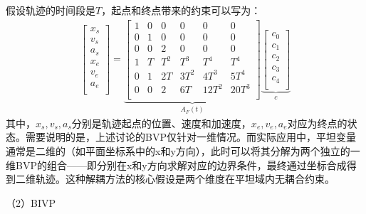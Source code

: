 \documentclass[master,academic]{ysuthesis} %
\begin{document}
		假设轨迹的时间段是$T$，起点和终点带来的约束可以写为：
		\begin{equation}
			\begin{aligned}
				\left[ \begin{array}{c}
				x_s\\
				v_s\\
				a_s\\
				x_e\\
				v_e\\
				a_e\\
				\end{array} \right] 
				=\underbrace{\begin{bmatrix}
					1&		0&		0&		0&		0&		0\\
					0&		1&		0&		0&		0&		0\\
					0&		0&		2&		0&		0&		0\\
					1&		T&		T^2&		T^3&		T^4&		T^4\\
					0&		1&		2T&		3T^2&		4T^3&		5T^4\\
					0&		0&		2&		6T&		12T^2&		20T^3\\
					\end{bmatrix}}_{A_F(t)}  
				\underbrace{\begin{bmatrix}
				c_0\\
				c_1\\
				c_2\\
				c_3\\
				c_4\\
				\end{bmatrix}}_{c} 
			\end{aligned}
			\label{eq:BVP}
		\end{equation}
		其中，$x_s,v_s,a_s$分别是轨迹起点的位置、速度和加速度，$x_e,v_e,a_e$对应为终点的状态。需要说明的是，上述讨论的BVP仅针对一维情况。而实际应用中，平坦变量通常是二维的（如平面坐标系中的x和y方向），此时可以将其分解为两个独立的一维BVP的组合——即分别在x和y方向求解对应的边界条件，最终通过坐标合成得到二维轨迹。这种解耦方法的核心假设是两个维度在平坦域内无耦合约束。
		
		（2）BIVP 
		
\end{document}
